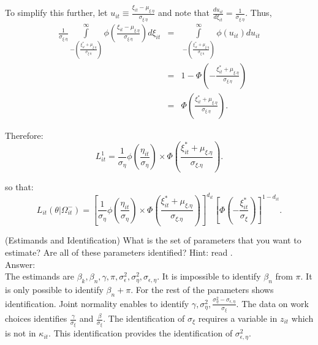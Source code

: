 \begin{exercise}
\noindent To simplify this further, let $u_{it} \equiv \frac{\xi_{it} - \mu_{\xi.\eta}}{\sigma_{\xi.\eta}}$ and note that $\frac{du_{it}}{d \xi_{it}} = \frac{1}{\sigma_{\xi.\eta}}$. Thus,
\begin{eqnarray}
\frac{1}{\sigma_{\xi.\eta}} \int \limits _{-  \left( \frac{\xi_{it}^{*} + \mu_{\xi.\eta}}{\sigma_{\xi.\eta}}  \right) } ^{\infty} \phi \left( \frac{\xi_{it} - \mu_{\xi.\eta}}{\sigma_{\xi.\eta}}  \right) d\xi_{it} &=& \int \limits _{-  \left( \frac{\xi_{it}^{*} + \mu_{\xi.\eta}}{\sigma_{\xi.\eta}}  \right) } ^{\infty} \phi (u_{it}) du_{it} \nonumber \\
&=& 1 - \Phi \left( -\frac{\xi_{it}^{*} + \mu_{\xi.\eta}}{\sigma_{\xi.\eta}} \right) \nonumber \\
&=& \Phi \left( \frac{\xi_{it}^{*} + \mu_{\xi.\eta}}{\sigma_{\xi.\eta}} \right).
\end{eqnarray}

\noindent Therefore:
\begin{equation}
L_{it}^1 = \frac{1}{\sigma_{\eta}} \phi \left( \frac{\eta_{it}}{\sigma_{\eta}} \right) \times \Phi \left( \frac{\xi_{it}^{*} + \mu_{\xi.\eta}}{\sigma_{\xi.\eta}} \right).
\end{equation}

\noindent so that:
\begin{equation}
L_{it} \left( \theta | \Omega_{it}^{-} \right) = \left[\frac{1}{\sigma_{\eta}} \phi \left( \frac{\eta_{it}}{\sigma_{\eta}} \right) \times \Phi \left( \frac{\xi_{it}^{*} + \mu_{\xi.\eta}}{\sigma_{\xi.\eta}} \right) \right]^{d_{it}} \left[ \Phi \left( - \frac{\xi_{it}^{*}}{\sigma_{\xi}}  \right) \right]^{1-d_{it}}.
\end{equation}











 




\end{exercise}

\begin{exercise} (Estimands and Identification) \label{exercise:estimands}
What is the set of parameters that you want to estimate? Are all of these parameters identified? Hint: read \citet{heckman1979sample}.\\ 
\noindent Answer:\\
\noindent The estimands are $\beta_{k}, \beta_{n}, \gamma, \pi, \sigma_{\epsilon}^2, \sigma_{\eta}^2, \sigma_{\epsilon, \eta} $. It is impossible to identify $\beta_{n}$ from $\pi$. It is only possible to identify $\beta_{n} + \pi$. For the rest of the parameters \citet{heckman1979sample} shows identification. Joint normality enables to identify $\gamma, \sigma_{\eta}^2, \frac{\sigma_{\eta}^2 - \sigma_{\epsilon, \eta}}{\sigma_{\xi}}$. The data on work choices identifies $\frac{\gamma}{\sigma_{\xi}}$ and $\frac{\beta}{\sigma_{\xi}}$. The identification of $\sigma_{\xi}$ requires a variable in $z_{it}$ which is not in $\kappa_{it}$. This identification provides the identification of $\sigma_{\epsilon, \eta}^2$. 
\end{exercise}

